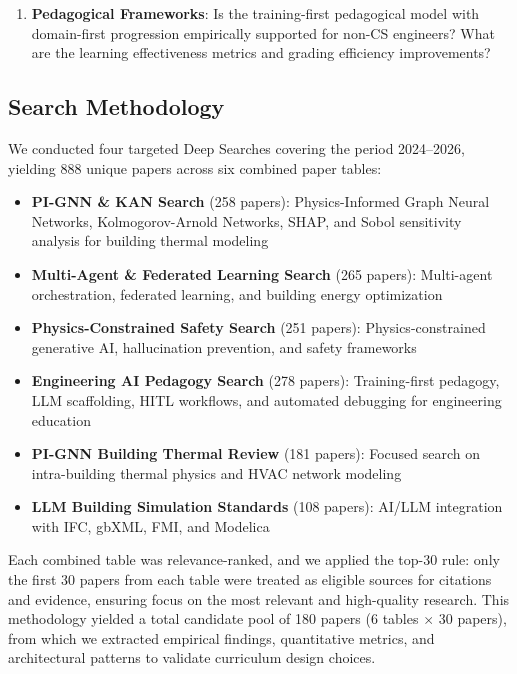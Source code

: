 \documentclass[12pt,a4paper]{article}
\begin{document}
\begin{enumerate}
  \item \textbf{Pedagogical Frameworks}: Is the training-first pedagogical model with domain-first progression empirically supported for non-CS engineers? What are the learning effectiveness metrics and grading efficiency improvements?
\end{enumerate}

\subsection{Search Methodology}

We conducted four targeted Deep Searches covering the period 2024--2026, yielding 888 unique papers across six combined paper tables:

\begin{itemize}
  \item \textbf{PI-GNN \& KAN Search} (258 papers): Physics-Informed Graph Neural Networks, Kolmogorov-Arnold Networks, SHAP, and Sobol sensitivity analysis for building thermal modeling
  \item \textbf{Multi-Agent \& Federated Learning Search} (265 papers): Multi-agent orchestration, federated learning, and building energy optimization
  \item \textbf{Physics-Constrained Safety Search} (251 papers): Physics-constrained generative AI, hallucination prevention, and safety frameworks
  \item \textbf{Engineering AI Pedagogy Search} (278 papers): Training-first pedagogy, LLM scaffolding, HITL workflows, and automated debugging for engineering education
  \item \textbf{PI-GNN Building Thermal Review} (181 papers): Focused search on intra-building thermal physics and HVAC network modeling
  \item \textbf{LLM Building Simulation Standards} (108 papers): AI/LLM integration with IFC, gbXML, FMI, and Modelica
\end{itemize}

Each combined table was relevance-ranked, and we applied the top-30 rule: only the first 30 papers from each table were treated as eligible sources for citations and evidence, ensuring focus on the most relevant and high-quality research. This methodology yielded a total candidate pool of 180 papers (6 tables $\times$ 30 papers), from which we extracted empirical findings, quantitative metrics, and architectural patterns to validate curriculum design choices.
\end{document}
